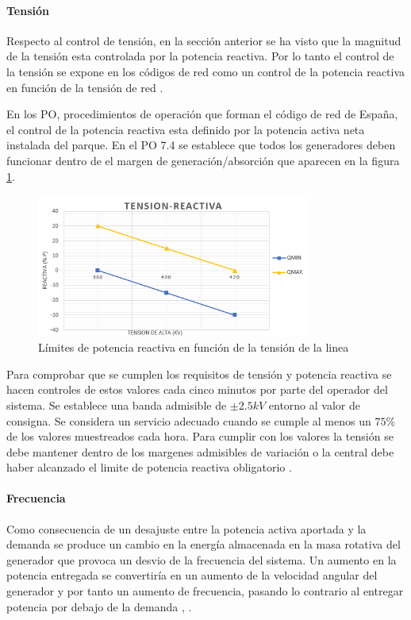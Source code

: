 \documentclass{book}
\begin{document}
		\paragraph{Tensi\'on}
Respecto al control de tensi\'on, en la secci\'on anterior se ha visto que la magnitud de la tensi\'on esta controlada por la potencia reactiva. Por lo tanto el control de la tensi\'on se expone en los c\'odigos de red como un control de la potencia reactiva en funci\'on de la tensi\'on de red \cite{WFgridcode}. \par

En los PO, procedimientos de operaci\'on que forman el c\'odigo de red de España, el control de la potencia reactiva esta definido por la potencia activa neta instalada del parque. En el PO 7.4 \cite{PO74}  se establece que todos los generadores deben funcionar dentro de el margen de generaci\'on/absorci\'on que aparecen en la figura \ref{VQgridcode}.   \par 

\begin{figure}[h!]
\centering
\includegraphics[width=0.8\textwidth]{VQgridcode.PNG}
\caption{L\'imites de potencia reactiva en funci\'on de la tensi\'on de la linea}
\label{VQgridcode}
\end{figure}

Para comprobar que se cumplen los requisitos de tensi\'on y potencia reactiva se hacen controles de estos valores cada cinco minutos por parte del operador del sistema. Se establece una banda admisible de $\pm2.5 kV$ entorno al valor de consigna. Se considera un servicio adecuado cuando se cumple al menos un $75\%$ de los valores muestreados cada hora. Para cumplir con los valores la tensi\'on  se debe mantener dentro de los margenes admisibles de variaci\'on o la central debe haber alcanzado el limite de potencia reactiva obligatorio \cite{PO74}. \par

		\paragraph{Frecuencia}
Como consecuencia de un desajuste entre la potencia activa aportada y la demanda se produce un cambio en la energía almacenada en la masa rotativa del generador que provoca un desvio de la frecuencia del sistema. Un aumento en la potencia entregada se convertir\'ia en un aumento de la velocidad angular del generador y por tanto un aumento de frecuencia, pasando lo contrario al entregar potencia por debajo de la demanda \cite{WFgridcode}, \cite{FrecuencyLvL}. \par
\end{document}
